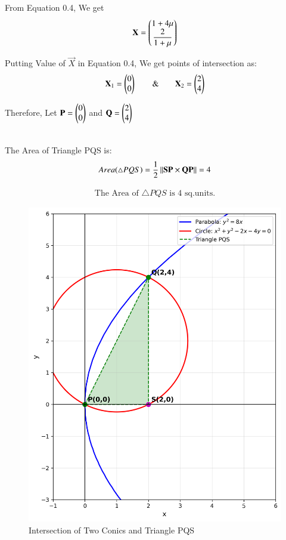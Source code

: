 \documentclass[journal]{IEEEtran}
\begin{document}
From Equation 0.4, We get
\begin{equation}
    \mathbf{X}=\begin{pmatrix}1+4\mu \\ \dfrac{2}{1+\mu}\end{pmatrix}
\end{equation}

Putting Value of $\vec{X}$ in Equation 0.4, We get points of intersection as:
\begin{equation}
    \mathbf{X}_1 = \begin{pmatrix}0 \\ 0\end{pmatrix} \qquad \& \qquad \mathbf{X}_2 = \begin{pmatrix}2 \\ 4\end{pmatrix}
\end{equation}

Therefore,
Let $\mathbf{P} = \begin{pmatrix}0 \\ 0\end{pmatrix}$ and $\mathbf{Q} = \begin{pmatrix}2 \\ 4\end{pmatrix}$\\\\

\newpage

The Area of Triangle PQS is:
\begin{equation}
    Area(\triangle PQS) = \dfrac{1}{2}\left\lVert\mathbf{SP} \times \mathbf{QP}\right\rVert = 4
\end{equation}

\begin{align*}
    \boxed{\text{The Area of $\triangle PQS$ is 4 sq.units.}}
\end{align*}


\begin{figure}[htbp]
    \centering
    \includegraphics[width=0.9\columnwidth]{figs/fig1.png}
    \caption{Intersection of Two Conics and Triangle PQS}
    \label{fig:figs/fig1.png}
\end{figure}
\end{document}
